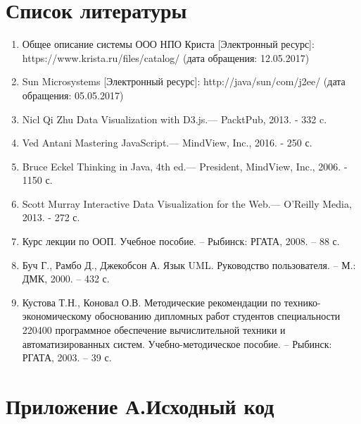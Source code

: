 \documentclass[a4paper]{extarticle}
\numberwithin{equation}{section}
\begin{document}
\section*{Список литературы}
\begin{enumerate}
\item Общее описание системы ООО НПО Криста [Электронный ресурс]: https://www.krista.ru/files/catalog/ (дата обращения: 12.05.2017)
\item Sun Microsystems [Электронный ресурс]: http://java/sun/com/j2ee/ (дата обращения: 05.05.2017)
\item Nicl Qi Zhu Data Visualization with D3.js.— PacktPub, 2013. - 332 c.
\item Ved Antani Mastering JavaScript.— MindView, Inc., 2016. - 250 с.
\item Bruce Eckel Thinking in Java, 4th ed.— President, MindView, Inc., 2006. - 1150 с.
\item Scott Murray Interactive Data Visualization for the Web.— O'Reilly Media, 2013. - 272 с.
\item Курс лекции по ООП. Учебное пособие. – Рыбинск: РГАТА, 2008. – 88 с.
\item Буч Г., Рамбо Д., Джекобсон А. Язык UML. Руководство пользователя. – М.: ДМК, 2000. – 432 с.
\item Кустова Т.Н., Коновал О.В. Методические рекомендации по технико- экономическому обоснованию дипломных работ студентов специальности 220400 программное обеспечение вычислительной техники и автоматизированных систем. Учебно-методическое пособие. – Рыбинск: РГАТА, 2003. – 39 с.
\end{enumerate}

\newpage
\section*{Приложение А.Исходный код}
% 
% 
\end{document}

